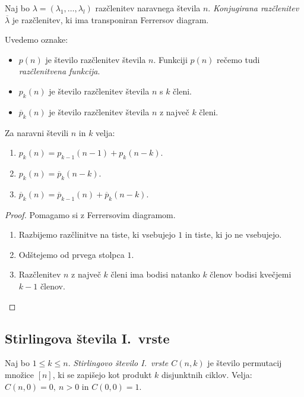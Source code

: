 \begin{definicija}
    Naj bo $\lambda = (\lambda_1, \ldots, \lambda_l)$ razčlenitev naravnega števila $n$. \emph{Konjugirana razčlenitev $\overline{\lambda}$} je razčlenitev, ki ima transponiran Ferrersov diagram.
\end{definicija}

Uvedemo oznake:
\begin{itemize}
    \item $p(n)$ je število razčlenitev števila $n$. Funkciji $p(n)$ rečemo tudi \emph{razčlenitvena funkcija}.
    \item $p_k(n)$ je število razčlenitev števila $n$ s $k$ členi.
    \item $\overline{p}_k(n)$ je število razčlenitev števila $n$ z največ $k$ členi.
\end{itemize}

\begin{trditev}
    Za naravni števili $n$ in $k$ velja:
    \begin{enumerate}
        \item $p_k(n) = p_{k-1}(n-1) + p_k(n-k)$.
        \item $p_k(n) = \overline{p}_k(n-k)$.
        \item $\overline{p}_k(n) = \overline{p}_{k-1}(n) + \overline{p}_k(n-k)$.
    \end{enumerate}
\end{trditev}

\begin{proof}
    Pomagamo si z Ferrersovim diagramom.
    \begin{enumerate}
        \item Razbijemo razčlinitve na tiste, ki vsebujejo $1$ in tiste, ki jo ne vsebujejo.
        \item Odštejemo od prvega stolpca $1$.
        \item Razčlenitev $n$ z največ $k$ členi ima bodisi natanko $k$ členov bodisi kvečjemi $k-1$ členov. \qedhere
    \end{enumerate}
\end{proof}

\subsection{Stirlingova števila I.\ vrste}
\begin{definicija}
    Naj bo $1 \leq k \leq n$. \emph{Stirlingovo število I.\ vrste $C(n,k)$} je število permutacij množice $[n]$, ki se zapišejo kot produkt $k$ disjunktnih ciklov.
    Velja: $C(n, 0) = 0, \ n > 0$ in $C(0,0) = 1$.
\end{definicija}

